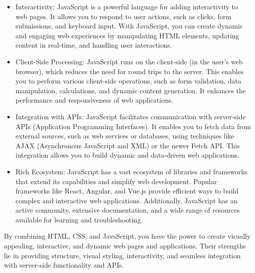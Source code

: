 \documentclass{article}
\begin{document}
\begin{itemize}
\item 	Interactivity: JavaScript is a powerful language for adding interactivity to web pages. It allows you to respond to user actions, such as clicks, form submissions, and keyboard input. With JavaScript, you can create dynamic and engaging web experiences by manipulating HTML elements, updating content in real-time, and handling user interactions.
\item 	Client-Side Processing: JavaScript runs on the client-side (in the user's web browser), which reduces the need for round trips to the server. This enables you to perform various client-side operations, such as form validation, data manipulation, calculations, and dynamic content generation. It enhances the performance and responsiveness of web applications.
\item 	Integration with APIs: JavaScript facilitates communication with server-side APIs (Application Programming Interfaces). It enables you to fetch data from external sources, such as web services or databases, using techniques like AJAX (Asynchronous JavaScript and XML) or the newer Fetch API. This integration allows you to build dynamic and data-driven web applications.
\item 	Rich Ecosystem: JavaScript has a vast ecosystem of libraries and frameworks that extend its capabilities and simplify web development. Popular frameworks like React, Angular, and Vue.js provide efficient ways to build complex and interactive web applications. Additionally, JavaScript has an active community, extensive documentation, and a wide range of resources available for learning and troubleshooting.
\end{itemize}
By combining HTML, CSS, and JavaScript, you have the power to create visually appealing, interactive, and dynamic web pages and applications. Their strengths lie in providing structure, visual styling, interactivity, and seamless integration with server-side functionality and APIs.
\end{document}
